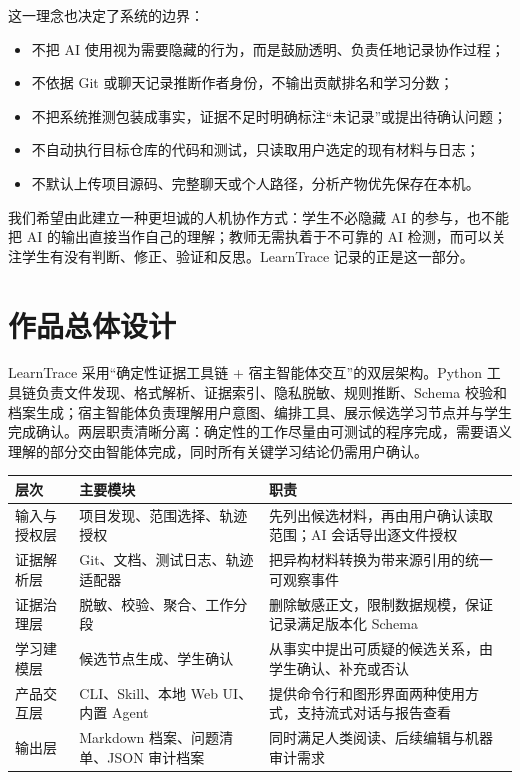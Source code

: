 \documentclass[UTF8,a4paper,12pt]{ctexart}
\begin{document}
这一理念也决定了系统的边界：

\begin{itemize}
  \item 不把 AI 使用视为需要隐藏的行为，而是鼓励透明、负责任地记录协作过程；
  \item 不依据 Git 或聊天记录推断作者身份，不输出贡献排名和学习分数；
  \item 不把系统推测包装成事实，证据不足时明确标注“未记录”或提出待确认问题；
  \item 不自动执行目标仓库的代码和测试，只读取用户选定的现有材料与日志；
  \item 不默认上传项目源码、完整聊天或个人路径，分析产物优先保存在本机。
\end{itemize}

我们希望由此建立一种更坦诚的人机协作方式：学生不必隐藏 AI 的参与，也不能把 AI 的输出直接当作自己的理解；教师无需执着于不可靠的 AI 检测，而可以关注学生有没有判断、修正、验证和反思。LearnTrace 记录的正是这一部分。

\section{作品总体设计}

LearnTrace 采用“确定性证据工具链 + 宿主智能体交互”的双层架构。Python 工具链负责文件发现、格式解析、证据索引、隐私脱敏、规则推断、Schema 校验和档案生成；宿主智能体负责理解用户意图、编排工具、展示候选学习节点并与学生完成确认。两层职责清晰分离：确定性的工作尽量由可测试的程序完成，需要语义理解的部分交由智能体完成，同时所有关键学习结论仍需用户确认。

\begin{center}
\small
\begin{tabular}{>{\raggedright\arraybackslash}p{}
                >{\raggedright\arraybackslash}p{}
                >{\raggedright\arraybackslash}p{}}
\toprule
\textbf{层次} & \textbf{主要模块} & \textbf{职责} \\
\midrule
输入与授权层 & 项目发现、范围选择、轨迹授权 & 先列出候选材料，再由用户确认读取范围；AI 会话导出逐文件授权 \\
证据解析层 & Git、文档、测试日志、轨迹适配器 & 把异构材料转换为带来源引用的统一可观察事件 \\
证据治理层 & 脱敏、校验、聚合、工作分段 & 删除敏感正文，限制数据规模，保证记录满足版本化 Schema \\
学习建模层 & 候选节点生成、学生确认 & 从事实中提出可质疑的候选关系，由学生确认、补充或否认 \\
产品交互层 & CLI、Skill、本地 Web UI、内置 Agent & 提供命令行和图形界面两种使用方式，支持流式对话与报告查看 \\
输出层 & Markdown 档案、问题清单、JSON 审计档案 & 同时满足人类阅读、后续编辑与机器审计需求 \\
\bottomrule
\end{tabular}
\end{center}
\end{document}
